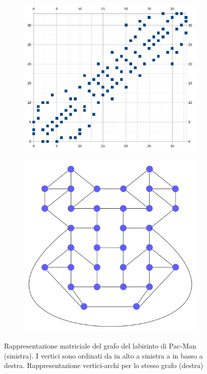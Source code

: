 \documentclass[8pt]{book}
\begin{document}
\begin{figure}
  \begin{subfigure}[b]{0.49\textwidth}
    \includegraphics[width=\textwidth]{img/pacman_grafo.png}
    \label{grafoProdotto_1}
   \end{subfigure}
  \begin{subfigure}[b]{0.49\textwidth}
    \includegraphics[width=\textwidth]{img/tuki5_grafo.png}
    \label{grafoProdotto_2}
  \end{subfigure}
  \caption{Rappresentazione matriciale del grafo del labirinto di Pac-Man (sinistra). I vertici sono ordinati da in alto a sinistra a in basso a destra. Rappresentazione vertici-archi per lo stesso grafo (destra)}
  \label{grafoProdotto}
\end{figure}
\end{document}
